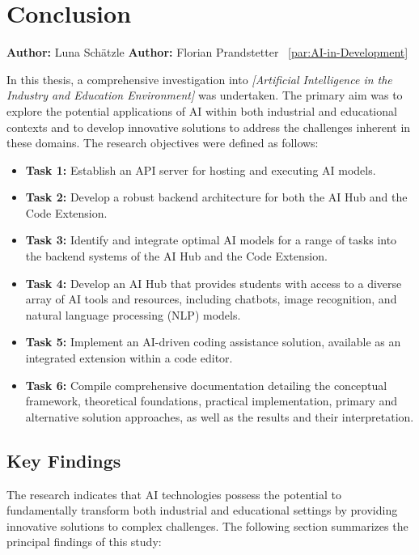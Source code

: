 \chapter{Conclusion}
\label{chap:Conclusion}
\textbf{Author:} Luna Schätzle
\textbf{Author:} Florian Prandstetter ~\ref{par:AI-in-Development}


In this thesis, a comprehensive investigation into \emph{[Artificial Intelligence in the Industry and Education Environment]} was undertaken. The primary aim was to explore the potential applications of AI within both industrial and educational contexts and to develop innovative solutions to address the challenges inherent in these domains. The research objectives were defined as follows:

\begin{itemize}
    \item \textbf{Task 1:} Establish an API server for hosting and executing AI models.
    \item \textbf{Task 2:} Develop a robust backend architecture for both the AI Hub and the Code Extension.
    \item \textbf{Task 3:} Identify and integrate optimal AI models for a range of tasks into the backend systems of the AI Hub and the Code Extension.
    \item \textbf{Task 4:} Develop an AI Hub that provides students with access to a diverse array of AI tools and resources, including chatbots, image recognition, and natural language processing (NLP) models.
    \item \textbf{Task 5:} Implement an AI-driven coding assistance solution, available as an integrated extension within a code editor.
    \item \textbf{Task 6:} Compile comprehensive documentation detailing the conceptual framework, theoretical foundations, practical implementation, primary and alternative solution approaches, as well as the results and their interpretation.
\end{itemize}

\section{Key Findings}

The research indicates that AI technologies possess the potential to fundamentally transform both industrial and educational settings by providing innovative solutions 
to complex challenges. The following section summarizes the principal findings of this study:

